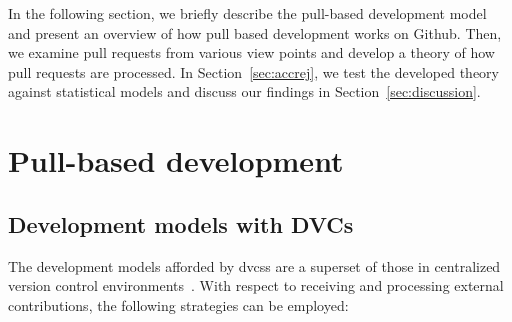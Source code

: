 \documentclass{sig-alternate}
\begin{document}
In the following section, we briefly describe the pull-based development model
and present an overview of how pull based development works on Github.
Then, we examine pull requests from various view points and develop
a theory of how pull requests are processed. In Section~\ref{sec:accrej},
we test the developed theory against statistical models and discuss our
findings in Section~\ref{sec:discussion}.

\section{Pull-based development}

\subsection{Development models with DVCs}

The development models afforded by {\sc dvcs}s are a superset of 
those in centralized version control environments~\cite{Shiha12,Bird09}. 
With respect to receiving and processing external contributions,
the following strategies can be employed:
\end{document}
